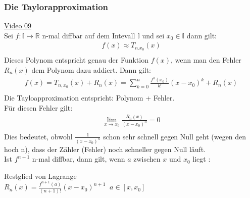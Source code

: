 \subsubsection{Die Taylorapproximation}
\href{https://youtu.be/sZeivAKBMa0}{Video 09}\\
Sei $ f: \mathbb{I}\longmapsto \mathbb{R} $ n-mal diffbar auf dem Intevall $  \mathbb{I} $ und sei $ x_0\in  \mathbb{I} $ dann gilt:\\
\begin{align*}
f(x)\approx T_{n.x_0}(x)\\
\end{align*}
Dieses Polynom entspricht genau der  Funktion $ f(x) $, wenn man den Fehler $ R_{n}(x) $ dem Polynom dazu addiert. Dann gilt:\\
\begin{align*}
f(x)=T_{n,x_0}(x)+R_{n}(x)=\sum\limits_{k=0}^{n}\frac{f^{k}(x_0)}{k!}(x-x_0)^k+R_n(x)\\
\end{align*}
Die Tayloapproximation entspricht: Polynom + Fehler.\\
Für diesen Fehler gilt:\\
\begin{align*}
\lim\limits_ {x\to x_0}\frac{R_n(x)}{(x-x_0)^n}=0\\
\end{align*}
Dies bedeutet, obwohl $ \frac{1}{(x-x_0)^n} $ schon sehr schnell gegen Null geht (wegen den hoch n), dass der Zähler (Fehler)  noch schneller gegen Null läuft.\vspace*{4mm}\\
Ist $ f^{n+1} $ n-mal diffbar, dann gilt, wenn $ a $ zwischen $ x $ und $ x_0 $ liegt :\\
\begin{center}
Restglied von Lagrange\\
$\boxed{R_n(x)=\frac{f^{n+1}(a)}{(n+1)!}(x-x_0)^{n+1}\;\;a\in[x,x_0]}$
\end{center}
